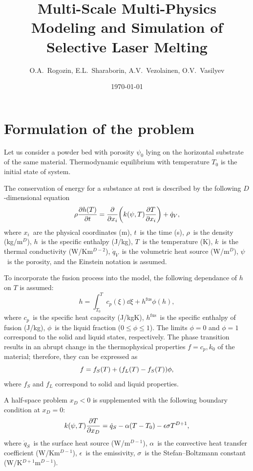 \documentclass{article}
\title{Multi-Scale Multi-Physics Modeling and Simulation of Selective Laser Melting}
\date{\today}
\author{O.A.~Rogozin, E.L.~Sharaborin, A.V.~Vezolainen, O.V.~Vasilyev}
\newcommand{\fusion}[1]{{#1}^\mathrm{fus}}
\begin{document}
\maketitle
\tableofcontents

\section{Formulation of the problem}

Let us consider a powder bed with porosity \(\psi_0\) lying on the horizontal substrate of the same material.
Thermodynamic equilibrium with temperature \(T_0\) is the initial state of system.

The conservation of energy for a substance at rest is described by the following \(D\)-dimensional equation
\begin{equation}\label{eq:heat_conduction}
    \rho\pdv{h(T)}{t} = \pdv{x_i}\qty( k(\psi,T)\pdv{T}{x_i} ) + \dot{q}_V,
\end{equation}
where \(x_i\)~are the physical coordinates (\si{m}), \(t\)~is the time (\si{s}),
\(\rho\)~is the density (\si{kg/m}\(^D\)), \(h\)~is the specific enthalpy (\si{J/kg}),
\(T\)~is the temperature (\si{\K}), \(k\)~is the thermal conductivity (\si{W/Km}\(^{D-2}\)),
\(\dot{q}_V\)~is the volumetric heat source (\si{W/m}\(^D\)), \(\psi\)~is the porosity,
and the Einstein notation is assumed.

To incorporate the fusion process into the model, the following dependance of \(h\) on \(T\) is assumed:
\begin{equation}\label{eq:enthalpy}
    h = \int_{T_0}^T c_p(\xi)\dd{\xi} + \fusion{h}\phi(h),
\end{equation}
where \(c_p\)~is the specific heat capacity (\si{J/kgK}), \(\fusion{h}\)~is the specific enthalpy of fusion (\si{J/kg}),
\(\phi\)~is the liquid fraction (\(0 \leq \phi \leq 1\)).
The limits \(\phi=0\) and \(\phi=1\) correspond to the solid and liquid states, respectively.
The phase transition results in an abrupt change in the thermophysical properties \(f=c_p,k_0\) of the material;
therefore, they can be expressed as
\begin{equation}\label{eq:fusion_change}
    f = f_S(T) + \qty( f_L(T) - f_S(T) )\phi,
\end{equation}
where \(f_S\) and \(f_L\) correspond to solid and liquid properties.

A half-space problem \(x_D<0\) is supplemented with the following boundary condition at \(x_D=0\):
\begin{equation}\label{eq:bc}
    k(\psi,T)\pdv{T}{x_D} = \dot{q}_S - \alpha(T-T_0) - \epsilon\sigma T^{D+1},
\end{equation}
where \(\dot{q}_S\)~is the surface heat source (\si{W/m}\(^{D-1}\)),
\(\alpha\)~is the convective heat transfer coefficient (\si{W/Km}\(^{D-1}\)),
\(\epsilon\)~is the emissivity, \(\sigma\)~is the Stefan--Boltzmann constant (\si{W/K}\(^{D+1}\)\si{m}\(^{D-1}\)).
\end{document}
